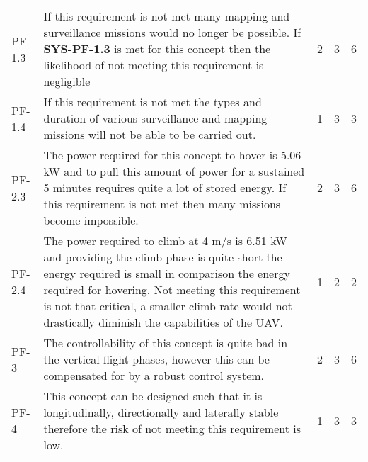 \begin{table}[]
\begin{tabularx}{\textwidth}{l L l l l}
        PF-1.3          & If this requirement is not met many mapping and surveillance missions would no longer be possible. If \textbf{SYS-PF-1.3} is met for this concept then the likelihood of not meeting this requirement is negligible                                                          & 2 & 3 & 6
        \\ \hdashline
        PF-1.4          & If this requirement is not met the types and duration of various surveillance and mapping missions will not be able to be carried out.                                                                                                                                          & 1 & 3 & 3
        \\ \hdashline
        PF-2.3          & The power required for this concept to hover is 5.06 kW and to pull this amount of power for a sustained 5 minutes requires quite a lot of stored energy. If this requirement is not met then many missions become impossible.                                                  & 2 & 3 & 6
        \\ \hdashline
        PF-2.4          & The power required to climb at 4 m/s is 6.51 kW and providing the climb phase is quite short the energy required is small in comparison the energy required for hovering. Not meeting this requirement is not that critical, a smaller climb rate would not drastically diminish the capabilities of the UAV.                                                                                                                             & 1 & 2 & 2 
        \\ \hdashline
        PF-3            & The controllability of this concept is quite bad in the vertical flight phases, however this can be compensated for by a robust control system.                                                                                                                                 & 2 & 3 & 6
        \\ \hdashline
        PF-4            & This concept can be designed such that it is longitudinally, directionally and laterally stable therefore the risk of not meeting this requirement is low.                                                                                                                      & 1 & 3 & 3
        \\ \bottomrule
    \end{tabularx}
\end{table}




